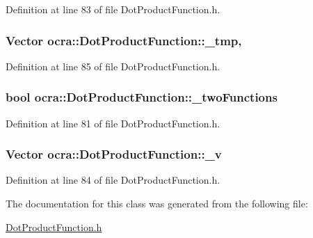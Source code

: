 Definition at line 83 of file Dot\+Product\+Function.\+h.

\subsubsection[{\texorpdfstring{\+\_\+tmp}{_tmp}}]{\setlength{\rightskip}{0pt plus 5cm}Vector ocra\+::\+Dot\+Product\+Function\+::\+\_\+tmp\hspace{0.3cm}{\ttfamily [mutable]}, {\ttfamily [protected]}}\hypertarget{classocra_1_1DotProductFunction_a82d2cb16e4b9b6d50e59fabfb25fc222}{}\label{classocra_1_1DotProductFunction_a82d2cb16e4b9b6d50e59fabfb25fc222}


Definition at line 85 of file Dot\+Product\+Function.\+h.

\subsubsection[{\texorpdfstring{\+\_\+two\+Functions}{_twoFunctions}}]{\setlength{\rightskip}{0pt plus 5cm}bool ocra\+::\+Dot\+Product\+Function\+::\+\_\+two\+Functions\hspace{0.3cm}{\ttfamily [protected]}}\hypertarget{classocra_1_1DotProductFunction_a8450996eff9607045cf57a4502ff0944}{}\label{classocra_1_1DotProductFunction_a8450996eff9607045cf57a4502ff0944}


Definition at line 81 of file Dot\+Product\+Function.\+h.

\subsubsection[{\texorpdfstring{\+\_\+v}{_v}}]{\setlength{\rightskip}{0pt plus 5cm}Vector ocra\+::\+Dot\+Product\+Function\+::\+\_\+v\hspace{0.3cm}{\ttfamily [protected]}}\hypertarget{classocra_1_1DotProductFunction_a6405d1f78159e5fc16801bd73eb32a68}{}\label{classocra_1_1DotProductFunction_a6405d1f78159e5fc16801bd73eb32a68}


Definition at line 84 of file Dot\+Product\+Function.\+h.



The documentation for this class was generated from the following file\+:\begin{DoxyCompactItemize}
\item 
\hyperlink{DotProductFunction_8h}{Dot\+Product\+Function.\+h}\end{DoxyCompactItemize}
